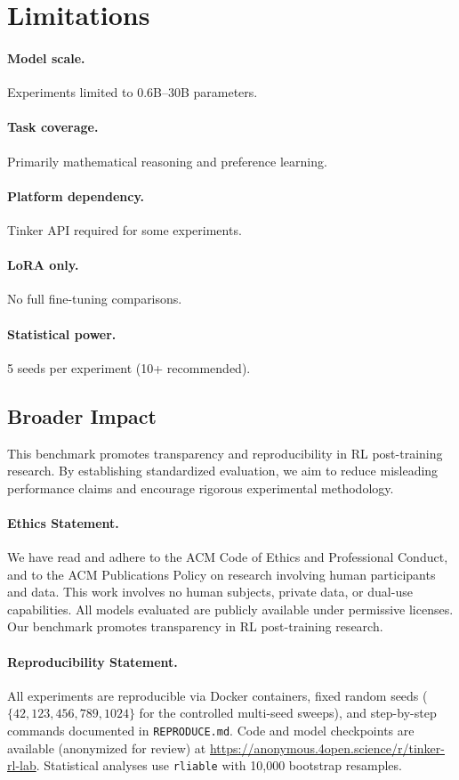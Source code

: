 \documentclass[manuscript,review,anonymous]{acmart}
\begin{document}
\section{Limitations}
\label{sec:limitations}


\paragraph{Model scale.} Experiments limited to 0.6B--30B parameters.
\paragraph{Task coverage.} Primarily mathematical reasoning and preference learning.
\paragraph{Platform dependency.} Tinker API required for some experiments.
\paragraph{LoRA only.} No full fine-tuning comparisons.
\paragraph{Statistical power.} 5 seeds per experiment (10+ recommended).

\subsection{Broader Impact}
\label{sec:impact}

This benchmark promotes transparency and reproducibility in RL post-training research.
By establishing standardized evaluation, we aim to reduce misleading performance claims
and encourage rigorous experimental methodology.

\paragraph{Ethics Statement.}
We have read and adhere to the ACM Code of Ethics and Professional Conduct, and to the ACM Publications Policy on research involving human participants and data. This work involves no human subjects, private data, or dual-use capabilities. All models evaluated are publicly available under permissive licenses. Our benchmark promotes transparency in RL post-training research.

\paragraph{Reproducibility Statement.}
\sloppy
All experiments are reproducible via Docker containers, fixed random seeds ($\{42, 123, 456, 789, 1024\}$ for the controlled multi-seed sweeps), and step-by-step commands documented in \texttt{REPRODUCE.md}. Code and model checkpoints are available (anonymized for review) at \url{https://anonymous.4open.science/r/tinker-rl-lab}. Statistical analyses use \texttt{rliable} with 10,000 bootstrap resamples.
\end{document}
